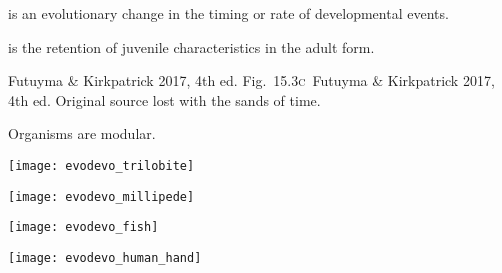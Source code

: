 \documentclass[t]{beamer}
\newcommand{\futuyma}[1]{%
	\ifthenelse{\isempty{#1}}%
	{Futuyma \& Kirkpatrick 2017, 4th ed.}%
	{Fig.~#1~Futuyma \& Kirkpatrick 2017, 4th ed.}%
}
\newcommand{\backskip}{\vspace{-0.5\baselineskip}}
\begin{document}
\begin{frame}{ is an evolutionary change in the timing or rate of developmental events.}

\backskip

\begin{multicols}{2}
\hangpara {} is the retention of juvenile characteristics in the adult form.

\medskip

\centering


\columnbreak


\end{multicols}
	
\vfilll

\tiny\futuyma{15.3\textsc{c}}\hfill Original source lost with the sands of time.
	
\end{frame}


\begin{frame}{Organisms are modular.}
\vspace{-\baselineskip}

\begin{multicols}{2}

\centering

\texttt{[image: evodevo\_trilobite]}

\vspace{0.5ex}

\noindent\texttt{[image: evodevo\_millipede]}

\columnbreak

\noindent\texttt{[image: evodevo\_fish]}

\vspace{0.5ex}

\texttt{[image: evodevo\_human\_hand]}

\end{multicols}
	
\end{frame}

\end{document}

